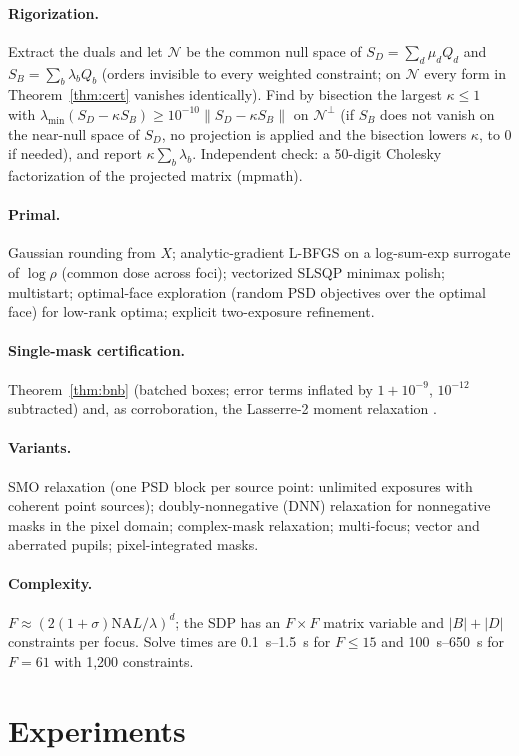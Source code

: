 \documentclass[11pt,a4paper]{article}
\newcommand{\NA}{\mathrm{NA}}
\begin{document}
\paragraph{Rigorization.} Extract the duals and let $\mathcal N$ be the common null space of $S_D=\sum_d\mu_dQ_d$ and $S_B=\sum_b\lambda_bQ_b$ (orders invisible to every weighted constraint; on $\mathcal N$ every form in Theorem~\ref{thm:cert} vanishes identically). Find by bisection the largest $\kappa\le1$ with $\lambda_{\min}(S_D-\kappa S_B)\ge10^{-10}\|S_D-\kappa S_B\|$ on $\mathcal N^\perp$ (if $S_B$ does not vanish on the near-null space of $S_D$, no projection is applied and the bisection lowers $\kappa$, to $0$ if needed), and report $\kappa\sum_b\lambda_b$. Independent check: a 50-digit Cholesky factorization of the projected matrix (mpmath).
\paragraph{Primal.} Gaussian rounding from $X$; analytic-gradient L-BFGS on a log-sum-exp surrogate of $\log\rho$ (common dose across foci); vectorized SLSQP minimax polish; multistart; optimal-face exploration (random PSD objectives over the optimal face) for low-rank optima; explicit two-exposure refinement.
\paragraph{Single-mask certification.} Theorem~\ref{thm:bnb} (batched boxes; error terms inflated by $1+10^{-9}$, $10^{-12}$ subtracted) and, as corroboration, the Lasserre-2 moment relaxation \cite{lasserre2001}.
\paragraph{Variants.} SMO relaxation (one PSD block per source point: unlimited exposures with coherent point sources); doubly-nonnegative (DNN) relaxation for nonnegative masks in the pixel domain; complex-mask relaxation; multi-focus; vector and aberrated pupils; pixel-integrated masks.
\paragraph{Complexity.} $F\approx(2(1+\sigma)\NA L/\lambda)^d$; the SDP has an $F\times F$ matrix variable and $|B|+|D|$ constraints per focus. Solve times are \SIrange{0.1}{1.5}{s} for $F\le15$ and \SIrange{100}{650}{s} for $F=61$ with 1,200 constraints.

\section{Experiments}\label{sec:exp}
\end{document}
